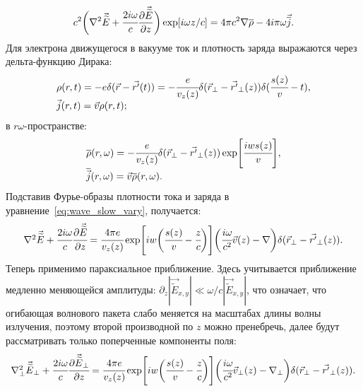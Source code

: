 \begin{equation}
	\label{eq:wave_slow_vary}
	c^2\bigg(\nabla^2 \vec{\widetilde{E}} + \cfrac{2i\omega}{c}\pdv{\vec{\widetilde{E}}}{z}\bigg)\exp[i\omega z/c] = 4\pi c^2 \nabla  \overline{\rho} - 4i\pi\omega\vec{\overline{j}}.
\end{equation}
Для электрона движущегося в вакууме ток и плотность заряда выражаются через дельта-функцию Дирака:
\begin{equation}
	\begin{array}{lcl}
		\rho(r,t) = -e\delta(\vec{r}- \vec{r'}(t)) = -\cfrac{e}{v_z(z)}\delta(\vec{r}_{\bot}- \vec{r'}_{\bot}(z))\delta(\cfrac{s(z)}{v} - t),\\
		\vec{j}(r,t) = \vec{v}\rho(r,t);
	\end{array}
\end{equation} 
в $r\omega$-пространстве: 
\begin{equation}
	\begin{array}{lcl}
		\overline{\rho}(r,\omega) = -\cfrac{e}{v_z(z)}\delta(\vec{r}_{\bot}- \vec{r'}_{\bot}(z))\exp[\cfrac{iws(z)}{v}],\\
		\overline{\vec{j}}(r,\omega) = \vec{v}\overline{\rho}(r,\omega).	
	\end{array}
\end{equation} 
Подставив Фурье-образы плотности тока и заряда в уравнение~\ref{eq:wave_slow_vary}, получается:
\begin{equation}
	\label{eq:wave_eq}
	\begin{array}{lcl}
		\nabla^2 \vec{\widetilde{E}} + \cfrac{2i\omega}{c}\cfrac{\partial\vec{\widetilde{E}}}{\partial z} = 
		\cfrac{4\pi e}{v_z(z)} \exp[iw\bigg(\cfrac{s(z)}{v} - \cfrac{z}{c}\bigg)]
		\bigg(  
			\cfrac{i\omega}{c^2}\vec{v}(z)
			-\nabla\bigg) \delta(\vec{r}_{\bot} - \vec{r'}_{\bot}(z)).
		
	\end{array}
\end{equation} 
Теперь применимо параксиальное приближение. Здесь учитывается приближение медленно меняющейся амплитуды: $\partial_z |\vec{\widetilde{E}}_{x,y}| \ll \omega /c|\vec{\widetilde{E}}_{x,y}|$, что означает, что огибающая волнового пакета слабо меняется на масштабах длины волны излучения, поэтому второй производной по $z$ можно пренебречь, далее будут рассматривать только поперченные компоненты поля:
\begin{equation}
	\label{eq:wave_slow_vary_parax}
	\begin{array}{lcl}
		\nabla_{\bot}^2 \vec{\widetilde{E}}_{\bot} + \cfrac{2i\omega}{c}\cfrac{\partial\vec{\widetilde{E}}_{\bot}}{\partial z} = 
		\cfrac{4\pi e}{v_z(z)} \exp[iw\bigg(\cfrac{s(z)}{v} - \cfrac{z}{c}\bigg)]\bigg(  
			\cfrac{i\omega}{c^2}\vec{v}_{\bot}(z) 
			-\nabla_{\bot}\bigg) \delta(\vec{r}_{\bot} - \vec{r'}_{\bot}(z)).
	\end{array}
\end{equation} 
